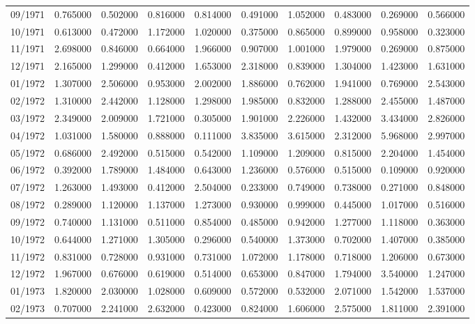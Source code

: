 \begin{tabular}{lrrrrrrrrr}
09/1971 & 0.765000 & 0.502000 & 0.816000 & 0.814000 & 0.491000 & 1.052000 & 0.483000 & 0.269000 & 0.566000 \\
10/1971 & 0.613000 & 0.472000 & 1.172000 & 1.020000 & 0.375000 & 0.865000 & 0.899000 & 0.958000 & 0.323000 \\
11/1971 & 2.698000 & 0.846000 & 0.664000 & 1.966000 & 0.907000 & 1.001000 & 1.979000 & 0.269000 & 0.875000 \\
12/1971 & 2.165000 & 1.299000 & 0.412000 & 1.653000 & 2.318000 & 0.839000 & 1.304000 & 1.423000 & 1.631000 \\
01/1972 & 1.307000 & 2.506000 & 0.953000 & 2.002000 & 1.886000 & 0.762000 & 1.941000 & 0.769000 & 2.543000 \\
02/1972 & 1.310000 & 2.442000 & 1.128000 & 1.298000 & 1.985000 & 0.832000 & 1.288000 & 2.455000 & 1.487000 \\
03/1972 & 2.349000 & 2.009000 & 1.721000 & 0.305000 & 1.901000 & 2.226000 & 1.432000 & 3.434000 & 2.826000 \\
04/1972 & 1.031000 & 1.580000 & 0.888000 & 0.111000 & 3.835000 & 3.615000 & 2.312000 & 5.968000 & 2.997000 \\
05/1972 & 0.686000 & 2.492000 & 0.515000 & 0.542000 & 1.109000 & 1.209000 & 0.815000 & 2.204000 & 1.454000 \\
06/1972 & 0.392000 & 1.789000 & 1.484000 & 0.643000 & 1.236000 & 0.576000 & 0.515000 & 0.109000 & 0.920000 \\
07/1972 & 1.263000 & 1.493000 & 0.412000 & 2.504000 & 0.233000 & 0.749000 & 0.738000 & 0.271000 & 0.848000 \\
08/1972 & 0.289000 & 1.120000 & 1.137000 & 1.273000 & 0.930000 & 0.999000 & 0.445000 & 1.017000 & 0.516000 \\
09/1972 & 0.740000 & 1.131000 & 0.511000 & 0.854000 & 0.485000 & 0.942000 & 1.277000 & 1.118000 & 0.363000 \\
10/1972 & 0.644000 & 1.271000 & 1.305000 & 0.296000 & 0.540000 & 1.373000 & 0.702000 & 1.407000 & 0.385000 \\
11/1972 & 0.831000 & 0.728000 & 0.931000 & 0.731000 & 1.072000 & 1.178000 & 0.718000 & 1.206000 & 0.673000 \\
12/1972 & 1.967000 & 0.676000 & 0.619000 & 0.514000 & 0.653000 & 0.847000 & 1.794000 & 3.540000 & 1.247000 \\
01/1973 & 1.820000 & 2.030000 & 1.028000 & 0.609000 & 0.572000 & 0.532000 & 2.071000 & 1.542000 & 1.537000 \\
02/1973 & 0.707000 & 2.241000 & 2.632000 & 0.423000 & 0.824000 & 1.606000 & 2.575000 & 1.811000 & 2.391000 \\

\end{tabular}
